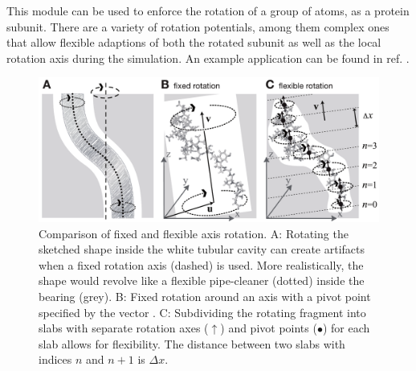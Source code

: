 This module can be used to enforce the rotation of a group of atoms, as {\eg}
a protein subunit. There are a variety of rotation potentials, among them
complex ones that allow flexible adaptions of both the rotated subunit as
well as the local rotation axis during the simulation. An example application 
can be found in ref. \cite{Kutzner2011}.

\begin{figure}
\centerline{\includegraphics[width=13cm]{plots/rotation.pdf}}
\caption[Fixed and flexible axis rotation]{Comparison of fixed and flexible axis
rotation. 
{\sf A:} Rotating the sketched shape inside the white tubular cavity can create
artifacts when a fixed rotation axis (dashed) is used. More realistically, the
shape would revolve like a flexible pipe-cleaner (dotted) inside the bearing (grey). 
{\sf B:} Fixed rotation around an axis  with a pivot point
specified by the vector . 
{\sf C:} Subdividing the rotating fragment into slabs with separate rotation
axes ($\uparrow$) and pivot points ($\bullet$) for each slab allows for
flexibility. The distance between two slabs with indices $n$ and $n+1$ is $\Delta x$.}
\label{fig:rotation}
\end{figure}


